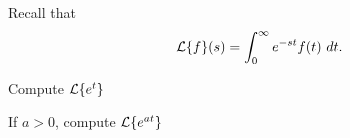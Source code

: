 \begin{applicationActivities}
\begin{activity}{5}
Recall that \[\mathcal{L}\{f\}(s)=\int _0 ^\infty e^{-st} f(t)\ dt.\]
\begin{subactivity}
Compute \(\mathcal{L}\{e^t\}\)
\end{subactivity}
\begin{subactivity}
If \(a>0\), compute \(\mathcal{L}\{e^{at}\}\)
\end{subactivity}
\end{activity}





\end{applicationActivities}
